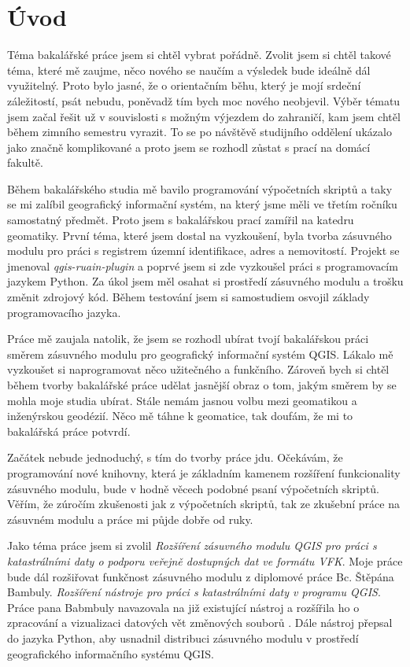 \chapter{Úvod}
\label{1-uvod}
Téma bakalářské práce jsem si chtěl vybrat pořádně. Zvolit jsem si chtěl takové téma, které mě zaujme, něco nového se naučím a výsledek bude ideálně dál využitelný. Proto bylo jasné, že o orientačním běhu, který je mojí srdeční záležitostí, psát nebudu, poněvadž tím bych moc nového neobjevil. Výběr tématu jsem začal řešit už v souvislosti s možným výjezdem do zahraničí, kam jsem chtěl během zimního semestru vyrazit. To se po návštěvě studijního oddělení ukázalo jako značně komplikované a proto jsem se rozhodl zůstat s prací na domácí fakultě.

Během bakalářského studia mě bavilo programování výpočetních skriptů a taky se mi zalíbil geografický informační systém, na který jsme měli ve třetím ročníku samostatný předmět. Proto jsem s bakalářskou prací zamířil na katedru geomatiky. První téma, které jsem dostal na vyzkoušení, byla tvorba zásuvného modulu pro práci s registrem územní identifikace, adres a nemovitostí. Projekt se jmenoval \textit{qgis-ruain-plugin} a poprvé jsem si zde vyzkoušel práci s programovacím jazykem Python. Za úkol jsem měl osahat si prostředí zásuvného modulu a trošku změnit zdrojový kód. Během testování jsem si samostudiem osvojil základy programovacího jazyka.

Práce mě zaujala natolik, že jsem se rozhodl ubírat tvojí bakalářskou práci směrem zásuvného modulu pro geografický informační systém QGIS. Lákalo mě vyzkoušet si naprogramovat něco užitečného a funkčního. Zároveň bych si chtěl během tvorby bakalářské práce udělat jasnější obraz o tom, jakým směrem by se mohla moje studia ubírat. Stále nemám jasnou volbu mezi geomatikou a inženýrskou geodézií. Něco mě táhne k geomatice, tak doufám, že mi to bakalářská práce potvrdí.

Začátek nebude jednoduchý, s tím do tvorby práce jdu. Očekávám, že programování nové knihovny, která je základním kamenem rozšíření funkcionality zásuvného modulu, bude v hodně věcech podobné psaní výpočetních skriptů.  Věřím, že zúročím zkušenosti jak z výpočetních skriptů, tak ze zkušební práce na zásuvném modulu a práce mi půjde dobře od ruky.

Jako téma práce jsem si zvolil \textit{Rozšíření zásuvného modulu QGIS pro práci s katastrálními daty o podporu veřejně dostupných dat ve formátu VFK}.  Moje práce bude dál rozšiřovat funkčnost zásuvného modulu z diplomové práce Bc. Štěpána Bambuly. \textit{Rozšíření nástroje pro práci s katastrálními daty v programu QGIS}. Práce pana Babmbuly navazovala na již existující nástroj a rozšířila ho o zpracování a vizualizaci datových vět změnových souborů . Dále nástroj přepsal do jazyka Python, aby usnadnil distribuci zásuvného modulu v prostředí geografického informačního systému QGIS.

